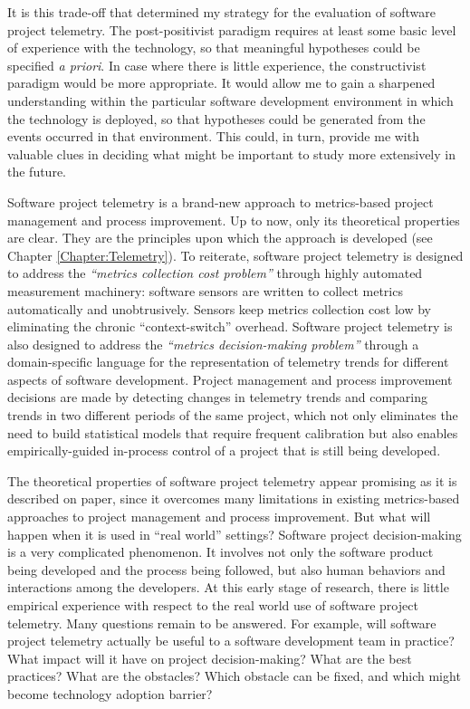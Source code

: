 It is this trade-off that determined my strategy for the evaluation of software project telemetry. The post-positivist paradigm requires at least some basic level of experience with the technology, so that meaningful hypotheses could be specified \textit{a priori}. In case where there is little experience, the constructivist paradigm would be more appropriate. It would allow me to gain a sharpened understanding within the particular software development environment in which the technology is deployed, so that hypotheses could be generated from the events occurred in that environment. This could, in turn, provide me with valuable clues in deciding what might be important to study more extensively in the future. 

Software project telemetry is a brand-new approach to metrics-based project management and process improvement. Up to now, only its theoretical properties are clear. They are the principles upon which the approach is developed (see Chapter \ref{Chapter:Telemetry}).
To reiterate, software project telemetry is designed to address the \textit{``metrics collection cost problem''} through highly automated measurement machinery: software sensors are written to collect metrics automatically and unobtrusively. Sensors keep metrics collection cost low by eliminating the chronic ``context-switch'' overhead.
Software project telemetry is also designed to address the \textit{``metrics decision-making problem''} through a domain-specific language for the representation of telemetry trends for different aspects of software development. Project management and process improvement decisions are made by detecting changes in telemetry trends and comparing trends in two different periods of the same project, which not only eliminates the need to build statistical models that require frequent calibration but also enables empirically-guided in-process control of a project that is still being developed.

The theoretical properties of software project telemetry appear promising as it is described on paper, since it overcomes many limitations in existing metrics-based approaches to project management and process improvement. But what will happen when it is used in ``real world'' settings? Software project decision-making is a very complicated phenomenon. It involves not only the software product being developed and the process being followed, but also human behaviors and interactions among the developers. 
At this early stage of research, there is little empirical experience with respect to the real world use of software project telemetry. Many questions remain to be answered.
For example, will software project telemetry actually be useful to a software development team in practice? What impact will it have on project decision-making? What are the best practices? What are the obstacles? Which obstacle can be fixed, and which might become technology adoption barrier? 


